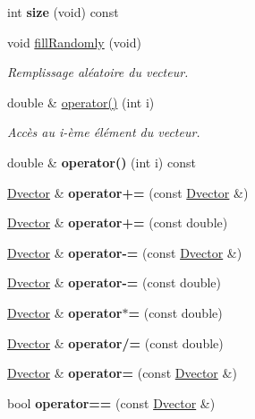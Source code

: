 \begin{DoxyCompactItemize}
\hypertarget{class_dvector_a62bb44cd0057acd565077aa3fbf3a79f}{}\label{class_dvector_a62bb44cd0057acd565077aa3fbf3a79f} 
int {\bfseries size} (void) const
\item 
\hypertarget{class_dvector_a6141ad0ac61b40c23d73eff8f490c771}{}\label{class_dvector_a6141ad0ac61b40c23d73eff8f490c771} 
void \hyperlink{class_dvector_a6141ad0ac61b40c23d73eff8f490c771}{fill\+Randomly} (void)
\begin{DoxyCompactList}\small\item\em Remplissage aléatoire du vecteur. \end{DoxyCompactList}\item 
double \& \hyperlink{class_dvector_ae355bf2da1777227c39e5687810c1b41}{operator()} (int i)
\begin{DoxyCompactList}\small\item\em Accès au i-\/ème élément du vecteur. \end{DoxyCompactList}\item 
\hypertarget{class_dvector_a237ba8b1ca7e68f78ec3f85ae800cbec}{}\label{class_dvector_a237ba8b1ca7e68f78ec3f85ae800cbec} 
double \& {\bfseries operator()} (int i) const
\item 
\hypertarget{class_dvector_af8792a4ca9c76251e5e6de5b7c73306f}{}\label{class_dvector_af8792a4ca9c76251e5e6de5b7c73306f} 
\hyperlink{class_dvector}{Dvector} \& {\bfseries operator+=} (const \hyperlink{class_dvector}{Dvector} \&)
\item 
\hypertarget{class_dvector_a764b88d94ce9e1921d6a07ec5b525ff6}{}\label{class_dvector_a764b88d94ce9e1921d6a07ec5b525ff6} 
\hyperlink{class_dvector}{Dvector} \& {\bfseries operator+=} (const double)
\item 
\hypertarget{class_dvector_a596872218e11d528f9f158b45027225a}{}\label{class_dvector_a596872218e11d528f9f158b45027225a} 
\hyperlink{class_dvector}{Dvector} \& {\bfseries operator-\/=} (const \hyperlink{class_dvector}{Dvector} \&)
\item 
\hypertarget{class_dvector_a8419b3b5fb7e2df2736b00ee24358aff}{}\label{class_dvector_a8419b3b5fb7e2df2736b00ee24358aff} 
\hyperlink{class_dvector}{Dvector} \& {\bfseries operator-\/=} (const double)
\item 
\hypertarget{class_dvector_a740fdcf601bd8327ac79c51c389fb9be}{}\label{class_dvector_a740fdcf601bd8327ac79c51c389fb9be} 
\hyperlink{class_dvector}{Dvector} \& {\bfseries operator$\ast$=} (const double)
\item 
\hypertarget{class_dvector_a4c59358d8c9b4f848e92f545645c7076}{}\label{class_dvector_a4c59358d8c9b4f848e92f545645c7076} 
\hyperlink{class_dvector}{Dvector} \& {\bfseries operator/=} (const double)
\item 
\hypertarget{class_dvector_a2130e57724c78e04d041ef58a885dc1c}{}\label{class_dvector_a2130e57724c78e04d041ef58a885dc1c} 
\hyperlink{class_dvector}{Dvector} \& {\bfseries operator=} (const \hyperlink{class_dvector}{Dvector} \&)
\item 
\hypertarget{class_dvector_a696e2627978288f060beb106c98c7b3c}{}\label{class_dvector_a696e2627978288f060beb106c98c7b3c} 
bool {\bfseries operator==} (const \hyperlink{class_dvector}{Dvector} \&)
\end{DoxyCompactItemize}


